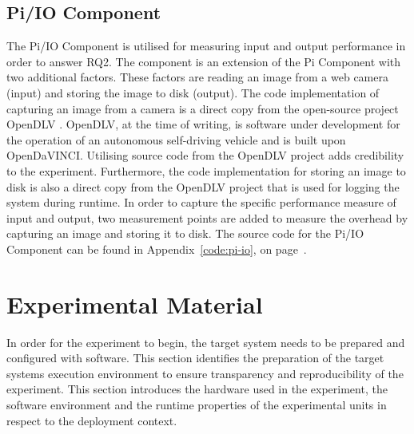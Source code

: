 \subsection{Pi/IO Component}
The Pi/IO Component is utilised for measuring input and output performance in order to answer RQ2. The component is an extension of the Pi Component with two additional factors. These factors are reading an image from a web camera (input) and storing the image to disk (output). The code implementation of capturing an image from a camera is a direct copy from the open-source project OpenDLV \cite{opendlv}. OpenDLV, at the time of writing, is software under development for the operation of an autonomous self-driving vehicle and is built upon OpenDaVINCI. Utilising source code from the OpenDLV project adds credibility to the experiment. Furthermore, the code implementation for storing an image to disk is also a direct copy from the OpenDLV project that is used for logging the system during runtime. In order to capture the specific performance measure of input and output, two measurement points are added to measure the overhead by capturing an image and storing it to disk. The source code for the Pi/IO Component can be found in Appendix~\ref{code:pi-io}, on page~\pageref{code:pi-io}.




\section{Experimental Material}
\label{section:exp-material}
In order for the experiment to begin, the target system needs to be prepared and configured with software. This section identifies the preparation of the target systems execution environment to ensure transparency and reproducibility of the experiment. This section introduces the hardware used in the experiment, the software environment and the runtime properties of the experimental units in respect to the deployment context. 

